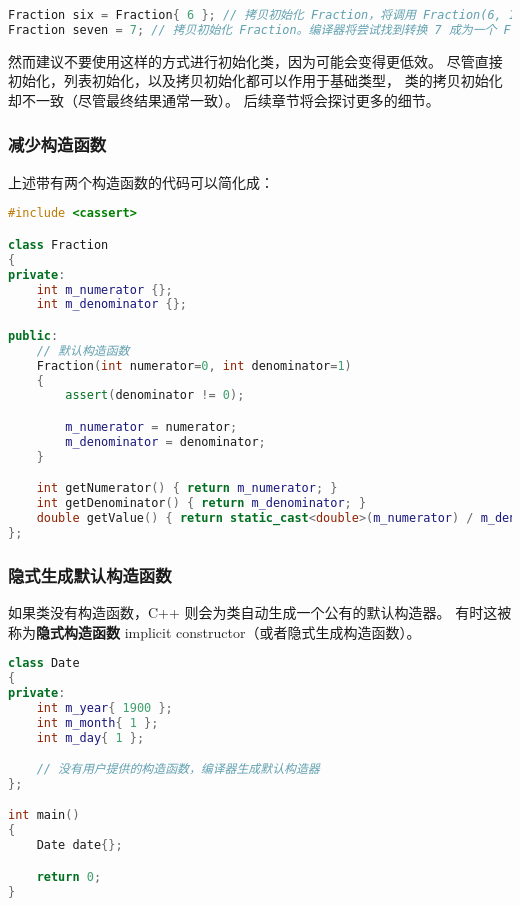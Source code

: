 \documentclass[../../LearnCpp.tex]{subfiles}
\begin{document}
\begin{lstlisting}[language=C++]
Fraction six = Fraction{ 6 }; // 拷贝初始化 Fraction，将调用 Fraction(6, 1)
Fraction seven = 7; // 拷贝初始化 Fraction。编译器将尝试找到转换 7 成为一个 Fraction 的方式，将唤起 Fraction(7, 1) 构造函数
\end{lstlisting}

然而建议不要使用这样的方式进行初始化类，因为可能会变得更低效。
尽管直接初始化，列表初始化，以及拷贝初始化都可以作用于基础类型，
类的拷贝初始化却不一致（尽管最终结果通常一致）。
后续章节将会探讨更多的细节。

\subsubsection*{减少构造函数}

上述带有两个构造函数的代码可以简化成：

\begin{lstlisting}[language=C++]
#include <cassert>

class Fraction
{
private:
    int m_numerator {};
    int m_denominator {};

public:
    // 默认构造函数
    Fraction(int numerator=0, int denominator=1)
    {
        assert(denominator != 0);

        m_numerator = numerator;
        m_denominator = denominator;
    }

    int getNumerator() { return m_numerator; }
    int getDenominator() { return m_denominator; }
    double getValue() { return static_cast<double>(m_numerator) / m_denominator; }
};
\end{lstlisting}

\subsubsection*{隐式生成默认构造函数}

如果类没有构造函数，C++ 则会为类自动生成一个公有的默认构造器。
有时这被称为\textbf{隐式构造函数} implicit constructor（或者隐式生成构造函数）。

\begin{lstlisting}[language=C++]
class Date
{
private:
    int m_year{ 1900 };
    int m_month{ 1 };
    int m_day{ 1 };

    // 没有用户提供的构造函数，编译器生成默认构造器
};

int main()
{
    Date date{};

    return 0;
}
\end{lstlisting}
\end{document}
